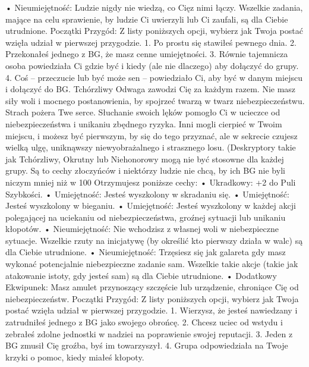     • Nieumiejętność: Ludzie nigdy nie wiedzą, co Cięz nimi łączy. Wszelkie zadania, mające na celu sprawienie, by ludzie Ci uwierzyli lub Ci zaufali, są dla Ciebie utrudnione.
Początki Przygód: Z listy poniższych opcji, wybierz jak Twoja postać wzięła udział w pierwszej przygodzie.
1. Po prostu się stawiłeś pewnego dnia.
2. Przekonałeś jednego z BG, że masz cenne umiejętności.
3. Równie tajemnicza osoba powiedziała Ci gdzie być i kiedy (ale nie dlaczego) aby dołączyć do grupy.
4. Coś – przeczucie lub być może sen – powiedziało Ci, aby być w danym miejscu i dołączyć do BG.
Tchórzliwy
Odwaga zawodzi Cię za każdym razem. Nie masz siły woli i mocnego postanowienia, by spojrzeć twarzą w twarz niebezpieczeństwu. Strach pożera Twe serce. Słuchanie swoich lęków pomogło Ci w ucieczce od niebezpieczeństwa i unikaniu zbędnego ryzyka. Inni mogli cierpieć w Twoim miejscu, i możesz być pierwszym, by się do tego przyznać, ale w sekrecie czujesz wielką ulgę, uniknąwszy niewyobrażalnego i strasznego losu.
(Deskryptory takie jak Tchórzliwy, Okrutny lub Niehonorowy mogą nie być stosowne dla każdej grupy. Są to cechy złoczyńców i niektórzy ludzie nie chcą, by ich BG nie byli niczym mniej niż w 100%
Otrzymujesz poniższe cechy:
    • Ukradkowy: +2 do Puli Szybkości.
    • Umiejętność: Jesteś wyszkolony w skradaniu się.
    • Umiejętność: Jesteś wyszkolony w bieganiu.
    • Umiejętność: Jesteś wyszkolony w każdej akcji polegającej na uciekaniu od niebezpieczeństwa, groźnej sytuacji lub unikaniu kłopotów. 
    • Nieumiejętność: Nie wchodzisz z własnej woli w niebezpieczne sytuacje. Wszelkie rzuty na inicjatywę (by określić kto pierwszy działa w walc) są dla Ciebie utrudnione.
    • Nieumiejętność: Trzęsiesz się jak galareta gdy masz wykonać potencjalnie niebezpieczne zadanie sam. Wszelkie takie akcje (takie jak atakowanie istoty, gdy jesteś sam) są dla Ciebie utrudnione.
    • Dodatkowy Ekwipunek: Masz amulet przynoszący szczęście lub urządzenie, chroniące Cię od niebezpieczeństw. 
Początki Przygód: Z listy poniższych opcji, wybierz jak Twoja postać wzięła udział w pierwszej przygodzie.
1. Wierzysz, że jesteś nawiedzany i zatrudniłeś jednego z BG jako swojego obrońcę.
2. Chcesz uciec od wstydu i zebrałeś zdolne jednostki w nadziei na poprawienie swojej reputacji.
3. Jeden z BG zmusił Cię groźba, byś im towarzyszył.
4. Grupa odpowiedziała na Twoje krzyki o pomoc, kiedy miałeś kłopoty.
